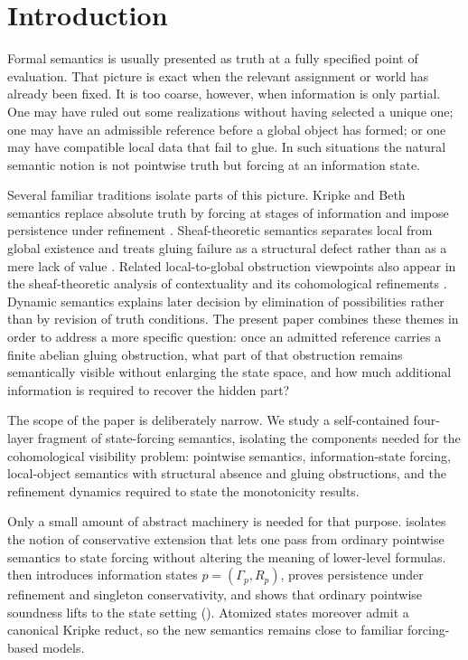 \section{Introduction}\label{sec:introduction}

Formal semantics is usually presented as truth at a fully specified point of evaluation. That picture is exact when the relevant assignment or world has already been fixed. It is too coarse, however, when information is only partial. One may have ruled out some realizations without having selected a unique one; one may have an admissible reference before a global object has formed; or one may have compatible local data that fail to glue. In such situations the natural semantic notion is not pointwise truth but forcing at an information state.

Several familiar traditions isolate parts of this picture. Kripke and Beth semantics replace absolute truth by forcing at stages of information and impose persistence under refinement \cite{Beth1956,Kripke1965,TroelstraVanDalen1988}. Sheaf-theoretic semantics separates local from global existence and treats gluing failure as a structural defect rather than as a mere lack of value \cite{MacLaneMoerdijk1994}. Related local-to-global obstruction viewpoints also appear in the sheaf-theoretic analysis of contextuality and its cohomological refinements \cite{AbramskyBrandenburger2011,Caru2017}. Dynamic semantics explains later decision by elimination of possibilities rather than by revision of truth conditions. The present paper combines these themes in order to address a more specific question: once an admitted reference carries a finite abelian gluing obstruction, what part of that obstruction remains semantically visible without enlarging the state space, and how much additional information is required to recover the hidden part?

The scope of the paper is deliberately narrow. We study a self-contained four-layer fragment of state-forcing semantics, isolating the components needed for the cohomological visibility problem: pointwise semantics, information-state forcing, local-object semantics with structural absence and gluing obstructions, and the refinement dynamics required to state the monotonicity results.

Only a small amount of abstract machinery is needed for that purpose.  isolates the notion of conservative extension that lets one pass from ordinary pointwise semantics to state forcing without altering the meaning of lower-level formulas.  then introduces information states $p=(\Gamma_p,R_p)$, proves persistence under refinement and singleton conservativity, and shows that ordinary pointwise soundness lifts to the state setting (). Atomized states moreover admit a canonical Kripke reduct, so the new semantics remains close to familiar forcing-based models.


